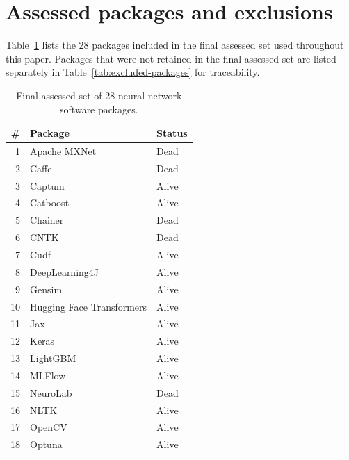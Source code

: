 \documentclass[final,1p,times,authoryear,12pt]{elsarticle}
\providecommand{\wss}[1]{\textcolor{blue}{\textit{#1}}}
\begin{document}
\appendix

\section{Assessed packages and exclusions}\label{app-packages}

Table~\ref{tab:final28} lists the 28 packages included in the
final assessed set used throughout this paper. Packages that were not retained in
the final assessed set are listed separately in
Table~\ref{tab:excluded-packages} for traceability.

\begin{table}[H]
\centering
\caption{Final assessed set of 28 neural network software packages.}
\label{tab:final28}
\begin{tabular}{r l l}
\toprule
\textbf{\#} & \textbf{Package} & \textbf{Status} \\
\midrule
1  & Apache MXNet              & Dead  \\
2  & Caffe                     & Dead  \\
3  & Captum                    & Alive \\
4  & Catboost                  & Alive \\
5  & Chainer                   & Dead  \\
6  & CNTK                      & Dead  \\
7  & Cudf                      & Alive \\
8  & DeepLearning4J            & Alive \\
9  & Gensim                    & Alive \\
10 & Hugging Face Transformers & Alive \\
11 & Jax                       & Alive \\
12 & Keras                     & Alive \\
13 & LightGBM                  & Alive \\
14 & MLFlow                    & Alive \\
15 & NeuroLab                  & Dead  \\
16 & NLTK                      & Alive \\
17 & OpenCV                    & Alive \\
18 & Optuna                    & Alive \\

\end{tabular}
\end{table}
\end{document}
